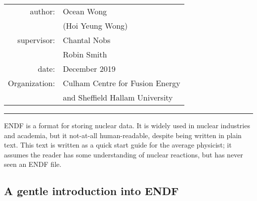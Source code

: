 \documentclass[a4paper, 12pt]{article}
\begin{document}
    
\begin{table}[!h]
\centering
\begin{tabular}{rl}
author:&Ocean Wong          \\
       &(Hoi Yeung Wong)    \\
supervisor:&Chantal Nobs    \\
           &Robin Smith     \\
date:  &December 2019       \\
Organization:&Culham Centre for Fusion Energy\\
            &and Sheffield Hallam University
\end{tabular}
\end{table}
\hrule
\bigbreak
\abstract ENDF is a format for storing nuclear data. It is widely used in nuclear industries and academia, but it not-at-all human-readable, despite being written in plain text. This text is written as a quick start guide for the average physicist; it assumes the reader has some understanding of nuclear reactions, but has never seen an ENDF file.

\begin{center}
\chapter{A gentle introduction into ENDF}
\end{center}
\end{document}
